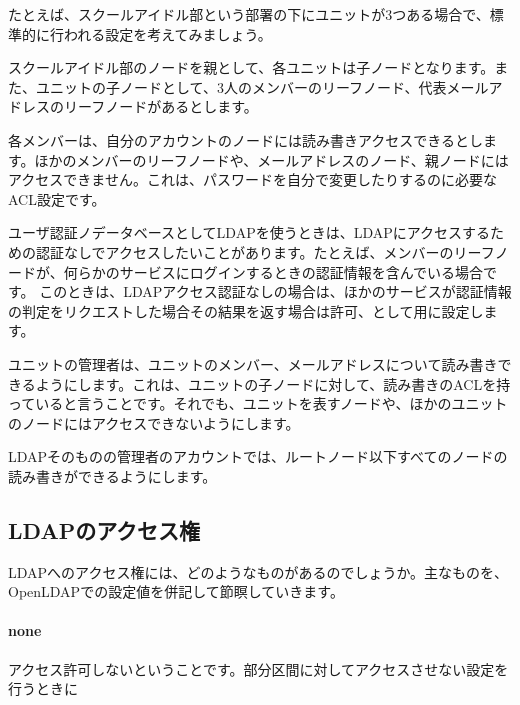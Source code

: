 たとえば、スクールアイドル部という部署の下にユニットが3つある場合で、標準的に行われる設定を考えてみましょう。

スクールアイドル部のノードを親として、各ユニットは子ノードとなります。また、ユニットの子ノードとして、3人のメンバーのリーフノード、代表メールアドレスのリーフノードがあるとします。

各メンバーは、自分のアカウントのノードには読み書きアクセスできるとします。ほかのメンバーのリーフノードや、メールアドレスのノード、親ノードにはアクセスできません。これは、パスワードを自分で変更したりするのに必要なACL設定です。

ユーザ認証ノデータベースとしてLDAPを使うときは、LDAPにアクセスするための認証なしでアクセスしたいことがあります。たとえば、メンバーのリーフノードが、何らかのサービスにログインするときの認証情報を含んでいる場合です。
このときは、LDAPアクセス認証なしの場合は、ほかのサービスが認証情報の判定をリクエストした場合その結果を返す場合は許可、として用に設定します。

ユニットの管理者は、ユニットのメンバー、メールアドレスについて読み書きできるようにします。これは、ユニットの子ノードに対して、読み書きのACLを持っていると言うことです。それでも、ユニットを表すノードや、ほかのユニットのノードにはアクセスできないようにします。

LDAPそのものの管理者のアカウントでは、ルートノード以下すべてのノードの読み書きができるようにします。

\subsection{LDAPのアクセス権}

LDAPへのアクセス権には、どのようなものがあるのでしょうか。主なものを、OpenLDAPでの設定値を併記して節瞑していきます。

\paragraph{none}
アクセス許可しないということです。部分区間に対してアクセスさせない設定を行うときに

